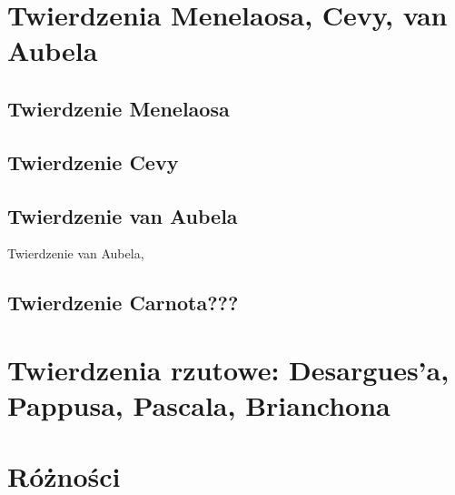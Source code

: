 
%

\section{Twierdzenia Menelaosa, Cevy, van Aubela}
\subsection{Twierdzenie Menelaosa}

\subsection{Twierdzenie Cevy}
 

\subsection{Twierdzenie van Aubela}
Twierdzenie van Aubela, 


\subsection{Twierdzenie Carnota???}


\section{Twierdzenia rzutowe: Desargues'a, Pappusa, Pascala, Brianchona}




\section{Różności}



%